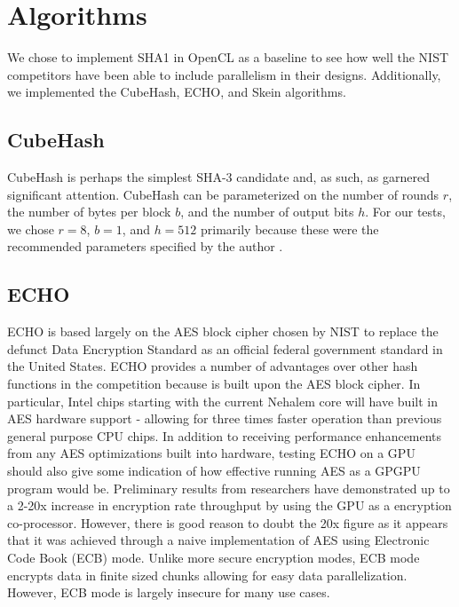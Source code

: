 \documentclass{article}
\begin{document}
 
\section*{Algorithms}
We chose to implement SHA1 in OpenCL as a baseline to see how well the NIST competitors have been able to include parallelism in their designs.  Additionally, we implemented the CubeHash, ECHO, and Skein algorithms.

\subsection*{CubeHash}

CubeHash is perhaps the simplest SHA-3 candidate and, as such, as garnered significant attention.
CubeHash can be parameterized on the number of rounds $r$, the number of bytes per block $b$, and the number of output bits $h$.
For our tests, we chose $r=8$, $b=1$, and $h=512$ primarily because these were the recommended parameters specified by the author \cite{CubeHash-spec}.

\subsection*{ECHO}
ECHO is based largely on the AES block cipher chosen by NIST to replace the defunct Data Encryption Standard as an official federal government standard in the United States.
ECHO provides a number of advantages over other hash functions in the competition because is built upon the AES block cipher.
In particular, Intel chips starting with the current Nehalem core will have built in AES hardware support - allowing for three times faster operation than previous general purpose CPU chips.\cite{Westmere}
In addition to receiving performance enhancements from any AES optimizations built into hardware, testing ECHO on a GPU should also give some indication of how effective running AES as a GPGPU program would be.
Preliminary results from researchers have demonstrated up to a 2\cite{Harrison}-20x\cite{Manavski}  increase in encryption rate throughput by using the GPU as a encryption co-processor.
However, there is good reason to doubt the 20x figure as it appears that it was achieved through a naive implementation of AES using Electronic Code Book (ECB) mode.
Unlike more secure encryption modes, ECB mode encrypts data in finite sized chunks allowing for easy data parallelization.  
However, ECB mode is largely insecure for many use cases.\cite{CodeBook}\\
\end{document}
